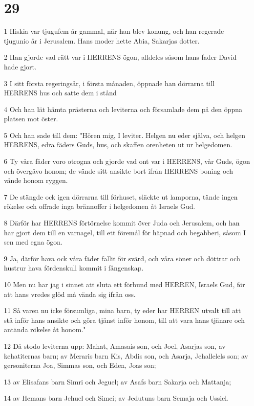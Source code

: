 \chapter{29}

\par 1 Hiskia var tjugufem år gammal, när han blev konung, och han regerade tjugunio år i Jerusalem. Hans moder hette Abia, Sakarjas dotter.
\par 2 Han gjorde vad rätt var i HERRENS ögon, alldeles såsom hans fader David hade gjort.
\par 3 I sitt första regeringsår, i första månaden, öppnade han dörrarna till HERRENS hus och satte dem i stånd
\par 4 Och han lät hämta prästerna och leviterna och församlade dem på den öppna platsen mot öster.
\par 5 Och han sade till dem: "Hören mig, I leviter. Helgen nu eder själva, och helgen HERRENS, edra fäders Guds, hus, och skaffen orenheten ut ur helgedomen.
\par 6 Ty våra fäder voro otrogna och gjorde vad ont var i HERRENS, vår Guds, ögon och övergåvo honom; de vände sitt ansikte bort ifrån HERRENS boning och vände honom ryggen.
\par 7 De stängde ock igen dörrarna till förhuset, släckte ut lamporna, tände ingen rökelse och offrade inga brännoffer i helgedomen åt Israels Gud.
\par 8 Därför har HERRENS förtörnelse kommit över Juda och Jerusalem, och han har gjort dem till en varnagel, till ett föremål för häpnad och begabberi, såsom I sen med egna ögon.
\par 9 Ja, därför hava ock våra fäder fallit för svärd, och våra söner och döttrar och hustrur hava fördenskull kommit i fångenskap.
\par 10 Men nu har jag i sinnet att sluta ett förbund med HERREN, Israels Gud, för att hans vredes glöd må vända sig ifrån oss.
\par 11 Så varen nu icke försumliga, mina barn, ty eder har HERREN utvalt till att stå inför hans ansikte och göra tjänst inför honom, till att vara hans tjänare och antända rökelse åt honom."
\par 12 Då stodo leviterna upp: Mahat, Amasais son, och Joel, Asarjas son, av kehatiternas barn; av Meraris barn Kis, Abdis son, och Asarja, Jehallelels son; av gersoniterna Joa, Simmas son, och Eden, Joas son;
\par 13 av Elisafans barn Simri och Jeguel; av Asafs barn Sakarja och Mattanja;
\par 14 av Hemans barn Jehuel och Simei; av Jedutuns barn Semaja och Ussiel.
